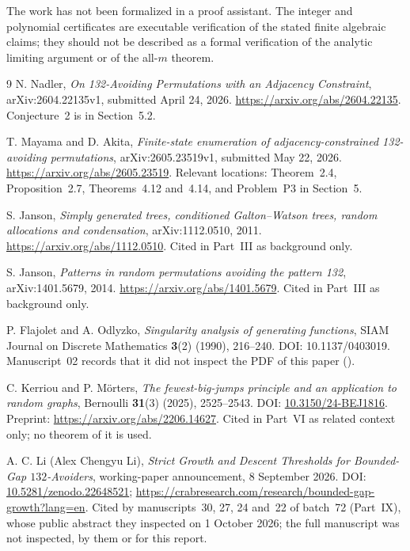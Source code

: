 \documentclass[11pt,a4paper]{article}
\theoremstyle{definition}\newaliascnt{definition}{theorem}
\theoremstyle{remark}\newaliascnt{remark}{theorem}
\begin{document}
The work has not been formalized in a proof assistant. The integer and
polynomial certificates are executable verification of the stated finite
algebraic claims; they should not be described as a formal verification
of the analytic limiting argument or of the all-$m$ theorem.

\begin{thebibliography}{9}
N. Nadler, \emph{On 132-Avoiding Permutations with an Adjacency Constraint},
arXiv:2604.22135v1, submitted April 24, 2026.
\url{https://arxiv.org/abs/2604.22135}.
Conjecture~2 is in Section~5.2.

T. Mayama and D. Akita, \emph{Finite-state enumeration of adjacency-constrained
132-avoiding permutations}, arXiv:2605.23519v1, submitted May 22, 2026.
\url{https://arxiv.org/abs/2605.23519}.
Relevant locations: Theorem~2.4, Proposition~2.7, Theorems~4.12 and~4.14,
and Problem~P3 in Section~5.

S. Janson, \emph{Simply generated trees, conditioned Galton--Watson trees,
random allocations and condensation}, arXiv:1112.0510, 2011.
\url{https://arxiv.org/abs/1112.0510}. Cited in Part~III as background only.

S. Janson, \emph{Patterns in random permutations avoiding the pattern 132},
arXiv:1401.5679, 2014. \url{https://arxiv.org/abs/1401.5679}.
Cited in Part~III as background only.

P. Flajolet and A. Odlyzko, \emph{Singularity analysis of generating
functions}, SIAM Journal on Discrete Mathematics \textbf{3}(2) (1990),
216--240. DOI: 10.1137/0403019. Manuscript~02 records that it did not inspect
the PDF of this paper ().

C. Kerriou and P. M\"orters, \emph{The fewest-big-jumps principle and an
application to random graphs}, Bernoulli \textbf{31}(3) (2025), 2525--2543.
DOI: \href{https://doi.org/10.3150/24-BEJ1816}{10.3150/24-BEJ1816}. Preprint:
\url{https://arxiv.org/abs/2206.14627}. Cited in Part~VI as related context
only; no theorem of it is used.

A. C. Li (Alex Chengyu Li), \emph{Strict Growth and Descent Thresholds for
Bounded-Gap $132$-Avoiders}, working-paper announcement, 8 September 2026.
DOI: \href{https://doi.org/10.5281/zenodo.22648521}{10.5281/zenodo.22648521};
\url{https://crabresearch.com/research/bounded-gap-growth?lang=en}. Cited by
manuscripts~30, 27, 24 and~22 of batch~72 (Part~IX), whose public abstract they
inspected on 1 October 2026; the full manuscript was not inspected, by them or
for this report.


\end{thebibliography}
\end{document}
